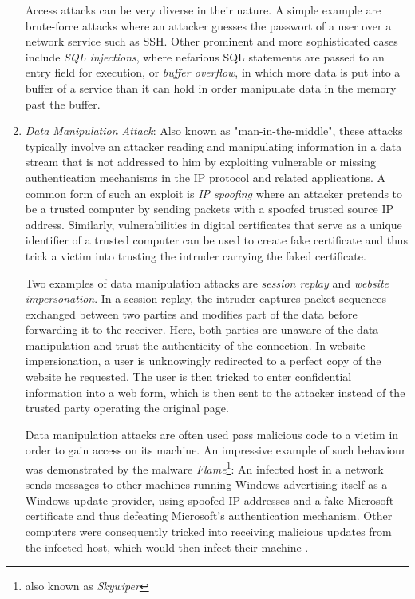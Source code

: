 \documentclass[a4paper,12pt,twoside]{report}
\begin{document}
\begin{enumerate}
Access attacks can be very diverse in their nature. A simple example are brute-force attacks where an attacker guesses the passwort of a user over a network service such as SSH. Other prominent and more sophisticated cases include \textit{SQL injections}, where nefarious SQL statements are passed to an entry field for execution, or \textit{buffer overflow}, in which more data is put into a buffer of a service than it can hold in order manipulate data in the memory past the buffer.


\item \textit{Data Manipulation Attack}: Also known as "man-in-the-middle", these attacks typically involve an attacker reading and manipulating information in a data stream that is not addressed to him by exploiting vulnerable or missing authentication mechanisms in the IP protocol and related applications. A common form of such an exploit is \textit{IP spoofing} where an attacker pretends to be a trusted computer by sending packets with a spoofed trusted source IP address. Similarly, vulnerabilities in digital certificates that serve as a unique identifier of a trusted computer can be used to create fake certificate and thus trick a victim into trusting the intruder carrying the faked certificate.

Two examples of data manipulation attacks are \textit{session replay} and \textit{website impersonation}. In a session replay, the intruder captures packet sequences exchanged between two parties and modifies part of the data before forwarding it to the receiver. Here, both parties are unaware of the data manipulation and trust the authenticity of the connection. In website impersionation, a user is unknowingly redirected to a perfect copy of the website he requested. The user is then tricked to enter confidential information into a web form, which is then sent to the attacker instead of the trusted party operating the original page. 


Data manipulation attacks are often used pass malicious code to a victim in order to gain access on its machine. An impressive example of such behaviour was demonstrated by the malware \textit{Flame}\footnote{also known as \textit{Skywiper}}: An infected host in a network sends messages to other machines running Windows advertising itself as a Windows update provider, using spoofed IP addresses and a fake Microsoft certificate and thus defeating Microsoft's authentication mechanism. Other computers were consequently tricked into receiving malicious updates from the infected host, which would then infect their machine \cite{skywiperskywiper}.




\end{enumerate}
\end{document}

